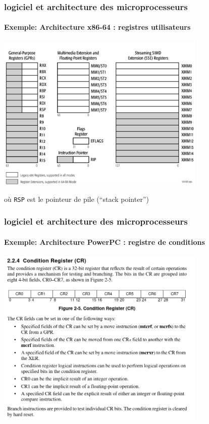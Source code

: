 \documentclass[xcolor=svgnames,final,smaller,a4]{beamer}
\begin{document}
\begin{frame}
  \frametitle{logiciel et architecture des microprocesseurs}
  \framesubtitle{Exemple: Architecture x86-64 : registres utilisateurs}

  \includegraphics[width=0.75\textwidth]{x86-64-registers}


  où \texttt{RSP} est le pointeur de pile (``stack pointer'')
\end{frame}

\begin{frame}
  \frametitle{logiciel et architecture des microprocesseurs}
  \framesubtitle{Exemple: Architecture PowerPC : registre de conditions}

  \includegraphics[width=0.75\textwidth]{powerpc-condreg}


\end{frame}
\end{document}
